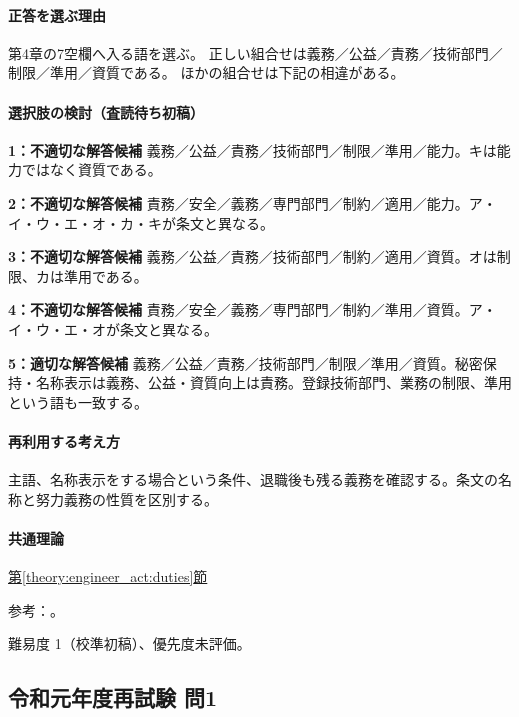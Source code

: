 \paragraph{正答を選ぶ理由} 第4章の7空欄へ入る語を選ぶ。 正しい組合せは義務／公益／責務／技術部門／制限／準用／資質である。 ほかの組合せは下記の相違がある。

\paragraph{選択肢の検討（査読待ち初稿）}

\noindent\textbf{1：不適切な解答候補} 義務／公益／責務／技術部門／制限／準用／能力。キは能力ではなく資質である。\par

\noindent\textbf{2：不適切な解答候補} 責務／安全／義務／専門部門／制約／適用／能力。ア・イ・ウ・エ・オ・カ・キが条文と異なる。\par

\noindent\textbf{3：不適切な解答候補} 義務／公益／責務／技術部門／制約／適用／資質。オは制限、カは準用である。\par

\noindent\textbf{4：不適切な解答候補} 責務／安全／義務／専門部門／制約／準用／資質。ア・イ・ウ・エ・オが条文と異なる。\par

\noindent\textbf{5：適切な解答候補} 義務／公益／責務／技術部門／制限／準用／資質。秘密保持・名称表示は義務、公益・資質向上は責務。登録技術部門、業務の制限、準用という語も一致する。\par

\paragraph{再利用する考え方} 主語、名称表示をする場合という条件、退職後も残る義務を確認する。条文の名称と努力義務の性質を区別する。

\paragraph{共通理論} \hyperref[theory:engineer_act:duties]{第\ref*{theory:engineer_act:duties}節}

\par 参考：\cite{engineer_act_current}。

\par 難易度 1（校準初稿）、優先度未評価。

\subsection{令和元年度再試験 問1}
\label{q:r01-ret-apt-01}

